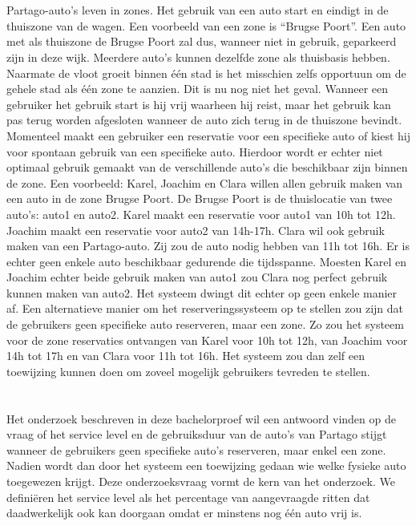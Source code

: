 \section{}
\label{sec:probleemstelling}
Partago-auto's leven in zones. Het gebruik van een auto start en eindigt in de thuiszone van de wagen. Een voorbeeld van een zone is ``Brugse Poort''. Een auto met als thuiszone de Brugse Poort zal dus, wanneer niet in gebruik, geparkeerd zijn in deze wijk. Meerdere auto's kunnen dezelfde zone als thuisbasis hebben. Naarmate de vloot groeit binnen één stad is het misschien zelfs opportuun om de gehele stad als één zone te aanzien. Dit is nu nog niet het geval. Wanneer een gebruiker het gebruik start is hij vrij waarheen hij reist, maar het gebruik kan pas terug worden afgesloten wanneer de auto zich terug in de thuiszone bevindt. Momenteel maakt een gebruiker een reservatie voor een specifieke auto of kiest hij voor spontaan gebruik van een specifieke auto. Hierdoor wordt er echter niet optimaal gebruik gemaakt van de verschillende auto's die beschikbaar zijn binnen de zone. Een voorbeeld: Karel, Joachim en Clara willen allen gebruik maken van een auto in de zone Brugse Poort. De Brugse Poort is de thuislocatie van twee auto's: auto1 en auto2. Karel maakt een reservatie voor auto1 van 10h tot 12h. Joachim maakt een reservatie voor auto2 van 14h-17h. Clara wil ook gebruik maken van een Partago-auto. Zij zou de auto nodig hebben van 11h tot 16h. Er is echter geen enkele auto beschikbaar gedurende die tijdsspanne. Moesten Karel en Joachim echter beide gebruik maken van auto1 zou Clara nog perfect gebruik kunnen maken van auto2. Het systeem dwingt dit echter op geen enkele manier af. Een alternatieve manier om het reserveringssysteem op te stellen zou zijn dat de gebruikers geen specifieke auto reserveren, maar een zone. Zo zou het systeem voor de zone reservaties ontvangen van Karel voor 10h tot 12h, van Joachim voor 14h tot 17h en van Clara voor 11h tot 16h. Het systeem zou dan zelf een toewijzing kunnen doen om zoveel mogelijk gebruikers tevreden te stellen.

\section{}
\label{sec:onderzoeksvraag}

Het onderzoek beschreven in deze bachelorproef wil een antwoord vinden op de vraag of het service level en de gebruiksduur van de auto's van Partago stijgt wanneer de gebruikers geen specifieke auto's reserveren, maar enkel een zone. Nadien wordt dan door het systeem een toewijzing gedaan wie welke fysieke auto toegewezen krijgt. Deze onderzoeksvraag vormt de kern van het onderzoek. We definiëren het service level als het percentage van aangevraagde ritten dat daadwerkelijk ook kan doorgaan omdat er minstens nog één auto vrij is.


